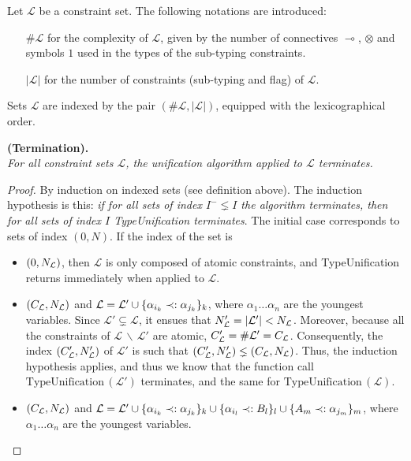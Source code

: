\begin{defn} Let $\mathcal{L}$ be a constraint set. The following notations are introduced:
	\begin{itemize}
		\item[$\#\mathcal{L}$] for the complexity of $\mathcal{L}$, given by the number of connectives $\multimap$,
			$\otimes$ and symbols $1$ used in the types of the sub-typing constraints.
		\item[$|\mathcal{L}|$] for the number of constraints (sub-typing and flag) of $\mathcal{L}$.
	\end{itemize}
	Sets $\mathcal{L}$ are indexed by the pair $(\#\mathcal{L}, |\mathcal{L}|)$, equipped with the lexicographical order.
\end{defn}

\begin{thm}{\bf (Termination).} \\
	\textit{For all constraint sets $\mathcal{L}$, the unification algorithm applied to $\mathcal{L}$ terminates. }
	\begin{proof}
		By induction on indexed sets (see definition above). The induction hypothesis is this: \textit{if for all sets of index $I^{-} \lneq I$ the
		algorithm terminates, then for all sets of index $I$ TypeUnification terminates}. The initial case corresponds to sets of index $(0, N)$.
		If the index of the set is
		\begin{itemize}
			\item $(0, N_{\mathcal{L}})$, then $\mathcal{L}$ is only composed of atomic constraints, and TypeUnification returns
				immediately when applied to $\mathcal{L}$.
				
			\item $(C_{\mathcal{L}}, N_{\mathcal{L}})$ and $\mathcal{L} = \mathcal{L}' \cup \{ \alpha_{i_k} \prec: \alpha_{j_k} \}_k$, where $\alpha_1 \dots \alpha_n$ are
				the youngest variables. Since $\mathcal{L'} \subsetneq \mathcal{L}$, it ensues that $N_{\mathcal{L}}' = |\mathcal{L'}| < N_{\mathcal{L}}$.
				Moreover, because all the constraints of $\mathcal{L} \,\backslash\, \mathcal{L'}$ are atomic, $C_{\mathcal{L}}' = \#\mathcal{L'} = C_{\mathcal{L}}$.
				Consequently, the index $(C_{\mathcal{L}}', N_{\mathcal{L}}')$ of $\mathcal{L'}$ is such that $(C_{\mathcal{L}}', N_{\mathcal{L}}') \lneq (C_{\mathcal{L}}, N_{\mathcal{L}})$.
				Thus, the induction hypothesis applies, and thus we know that the function call $\text{TypeUnification}\,(\mathcal{L'})$ terminates, and the same
				for $\text{TypeUnification}\,(\mathcal{L})$.
			
			\item $(C_{\mathcal{L}}, N_{\mathcal{L}})$ and $\mathcal{L} = \mathcal{L}' \cup \{ \alpha_{i_k} \prec: \alpha_{j_k} \}_k \cup \{ \alpha_{i_l} \prec: B_l \}_l
				\cup \{ A_m \prec: \alpha_{j_m} \}_m$, where $\alpha_1 \dots \alpha_n$ are the youngest variables.


\end{itemize}
\end{proof}
\end{thm}
